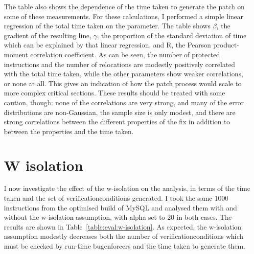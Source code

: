 The table also shows the dependence of the time taken to generate the
patch on some of these measurements.  For these calculations, I
performed a simple linear regression of the total time taken on the
parameter.  The table shows $\beta$, the gradient of the resulting
line, $\gamma$, the proportion of the standard deviation of time which
can be explained by that linear regression, and R, the Pearson
product-moment correlation coefficient.  As can be seen, the number of
protected instructions and the number of relocations are modestly
positively correlated with the total time taken, while the other
parameters show weaker correlations, or none at all.  This gives an
indication of how the patch process would scale to more complex
critical sections.  These results should be treated with some caution,
though: none of the correlations are very strong, and many of the
error distributions are non-Gaussian, the sample size is only modest,
and there are strong correlations between the different properties of
the fix in addition to between the properties and the time taken.

\section{W isolation}
\label{sect:eval:w_isolation}


I now investigate the effect of the \gls{w-isolation} on the analysis,
in terms of the time taken and the set of
\glspl{verificationcondition} generated.  I took the same 1000
instructions from the optimised build of MySQL and analysed them with
and without the \gls{w-isolation} assumption, with \gls{alpha} set to
20 in both cases.  The results are shown in
Table~\ref{table:eval:w-isolation}.  As expected, the
\gls{w-isolation} assumption modestly decreases both the number of
\glspl{verificationcondition} which must be checked by run-time
\glspl{bugenforcer} and the time taken to generate them.

